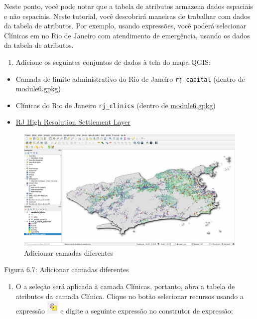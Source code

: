 \documentclass[
]{book}
\providecommand{\tightlist}{%
  \setlength{\itemsep}{0pt}\setlength{\parskip}{0pt}}
\begin{document}
Neste ponto, você pode notar que a tabela de atributos armazena dados espaciais e não espaciais. Neste tutorial, você descobrirá maneiras de trabalhar com dados da tabela de atributos. Por exemplo, usando expressões, você poderá selecionar Clínicas em no Rio de Janeiro com atendimento de emergência, usando os dados da tabela de atributos.

\begin{enumerate}
\def\labelenumi{\arabic{enumi}.}
\tightlist
\item
  Adicione os seguintes conjuntos de dados à tela do mapa QGIS:
\end{enumerate}

\begin{itemize}
\tightlist
\item
  Camada de limite administrativo do Rio de Janeiro \texttt{rj\_capital} (dentro de \href{data/module6.gpkg}{module6.gpkg})
\item
  Clínicas do Rio de Janeiro \texttt{rj\_clinics} (dentro de \href{data/module6.gpkg}{module6.gpkg})
\item
  \href{data/hrsl_rj_capital_populacao.tif}{RJ High Resolution Settlement Layer}
\end{itemize}

\begin{figure}
\centering
\includegraphics{media/modulo6/add-layers.png}
\caption{Adicionar camadas diferentes}
\end{figure}

Figura 6.7: Adicionar camadas diferentes

\begin{enumerate}
\def\labelenumi{\arabic{enumi}.}
\setcounter{enumi}{1}
\tightlist
\item
  O a seleção será aplicada à camada Clínicas, portanto, abra a tabela de atributos da camada Clínica. Clique no botão selecionar recursos usando a expressão \includegraphics{media/modulo6/select_features_button.png} e digite a seguinte expressão no construtor de expressão;
\end{enumerate}
\end{document}
